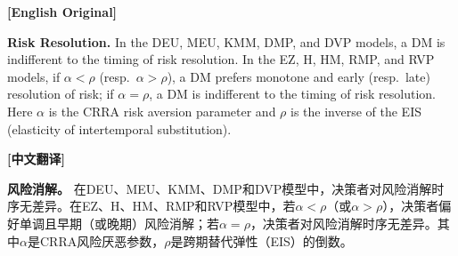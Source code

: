 \documentclass[12pt,a4paper]{ctexart}
\newenvironment{original}{%
  \par\medskip\noindent\textbf{[English Original]}\par\smallskip
  \color{black}\small
}{%
  \par\medskip
}
\newenvironment{translation}{%
  \par\noindent\textbf{[中文翻译]}\par\smallskip
  \color{blue}\small
}{%
  \par\bigskip
}
\theoremstyle{definition}
\theoremstyle{remark}
\begin{document}
\begin{original}
\textbf{Risk Resolution.} In the DEU, MEU, KMM, DMP, and DVP models, a DM is indifferent to the timing of risk resolution. In the EZ, H, HM, RMP, and RVP models, if $\alpha < \rho$ (resp.\ $\alpha > \rho$), a DM prefers monotone and early (resp.\ late) resolution of risk; if $\alpha = \rho$, a DM is indifferent to the timing of risk resolution. Here $\alpha$ is the CRRA risk aversion parameter and $\rho$ is the inverse of the EIS (elasticity of intertemporal substitution).
\end{original}
\begin{translation}
\textbf{风险消解。} 在DEU、MEU、KMM、DMP和DVP模型中，决策者对风险消解时序无差异。在EZ、H、HM、RMP和RVP模型中，若$\alpha < \rho$（或$\alpha > \rho$），决策者偏好单调且早期（或晚期）风险消解；若$\alpha = \rho$，决策者对风险消解时序无差异。其中$\alpha$是CRRA风险厌恶参数，$\rho$是跨期替代弹性（EIS）的倒数。
\end{translation}
\end{document}
